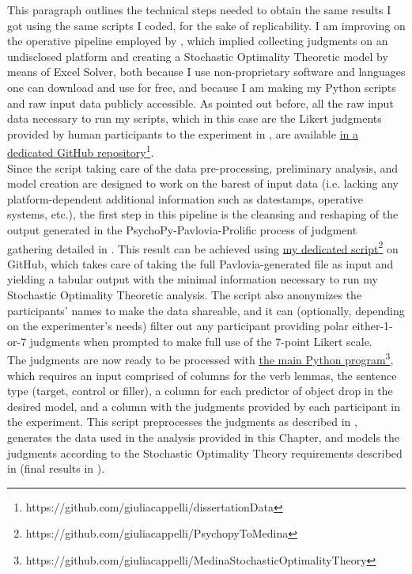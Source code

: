 This paragraph outlines the technical steps needed to obtain the same results I got using the same scripts I coded, for the sake of replicability. I am improving on the operative pipeline employed by \textcite{Medina2007}, which implied collecting judgments on an undisclosed platform and creating a Stochastic Optimality Theoretic model by means of Excel Solver, both because I use non-proprietary software and languages one can download and use for free, and because I am making my Python scripts and raw input data publicly accessible. As pointed out before, all the raw input data necessary to run my scripts, which in this case are the Likert judgments provided by human participants to the experiment in , are available \href{https://github.com/giuliacappelli/dissertationData}{in a dedicated GitHub repository}\footnote{https://github.com/giuliacappelli/dissertationData}.\\
Since the script taking care of the data pre-processing, preliminary analysis, and model creation are designed to work on the barest of input data (i.e. lacking any platform-dependent additional information such as datestamps, operative systems, etc.), the first step in this pipeline is the cleansing and reshaping of the output generated in the PsychoPy-Pavlovia-Prolific process of judgment gathering detailed in . This result can be achieved using \href{https://github.com/giuliacappelli/PsychopyToMedina}{my dedicated script}\footnote{https://github.com/giuliacappelli/PsychopyToMedina} on GitHub, which takes care of taking the full Pavlovia-generated file as input and yielding a tabular output with the minimal information necessary to run my Stochastic Optimality Theoretic analysis. The script also anonymizes the participants' names to make the data shareable, and it can (optionally, depending on the experimenter's needs) filter out any participant providing polar either-1-or-7 judgments when prompted to make full use of the 7-point Likert scale.\\
The judgments are now ready to be processed with \href{https://github.com/giuliacappelli/MedinaStochasticOptimalityTheory}{the main Python program}\footnote{https://github.com/giuliacappelli/MedinaStochasticOptimalityTheory}, which requires an input comprised of columns for the verb lemmas, the sentence type (target, control or filler), a column for each predictor of object drop in the desired model, and a column with the judgments provided by each participant in the experiment. This script preprocesses the judgments as described in , generates the data used in the analysis provided in this Chapter, and models the judgments according to the Stochastic Optimality Theory requirements described in  (final results in ).

